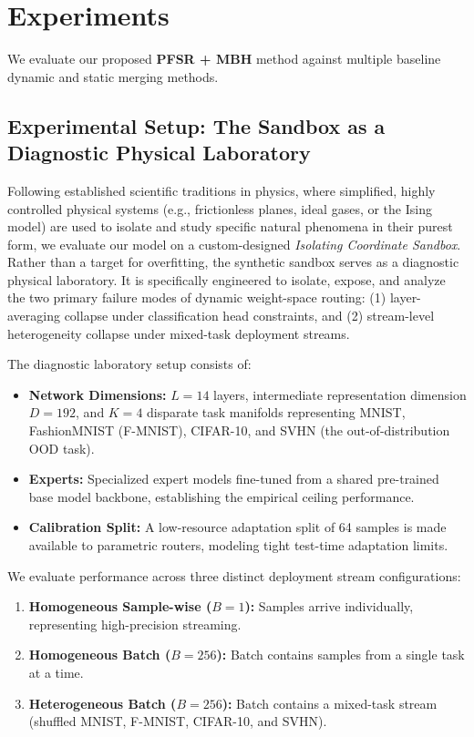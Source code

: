 \section{Experiments}
\label{sec:experiments}

We evaluate our proposed \textbf{PFSR + MBH} method against multiple baseline dynamic and static merging methods. 

\subsection{Experimental Setup: The Sandbox as a Diagnostic Physical Laboratory}
Following established scientific traditions in physics, where simplified, highly controlled physical systems (e.g., frictionless planes, ideal gases, or the Ising model) are used to isolate and study specific natural phenomena in their purest form, we evaluate our model on a custom-designed \emph{Isolating Coordinate Sandbox}. Rather than a target for overfitting, the synthetic sandbox serves as a diagnostic physical laboratory. It is specifically engineered to isolate, expose, and analyze the two primary failure modes of dynamic weight-space routing: (1) layer-averaging collapse under classification head constraints, and (2) stream-level heterogeneity collapse under mixed-task deployment streams.

The diagnostic laboratory setup consists of:
\begin{itemize}
    \item \textbf{Network Dimensions:} $L=14$ layers, intermediate representation dimension $D=192$, and $K=4$ disparate task manifolds representing MNIST, FashionMNIST (F-MNIST), CIFAR-10, and SVHN (the out-of-distribution OOD task).
    \item \textbf{Experts:} Specialized expert models fine-tuned from a shared pre-trained base model backbone, establishing the empirical ceiling performance.
    \item \textbf{Calibration Split:} A low-resource adaptation split of 64 samples is made available to parametric routers, modeling tight test-time adaptation limits.
\end{itemize}

We evaluate performance across three distinct deployment stream configurations:
\begin{enumerate}
    \item \textbf{Homogeneous Sample-wise ($B=1$):} Samples arrive individually, representing high-precision streaming.
    \item \textbf{Homogeneous Batch ($B=256$):} Batch contains samples from a single task at a time.
    \item \textbf{Heterogeneous Batch ($B=256$):} Batch contains a mixed-task stream (shuffled MNIST, F-MNIST, CIFAR-10, and SVHN).
\end{enumerate}

